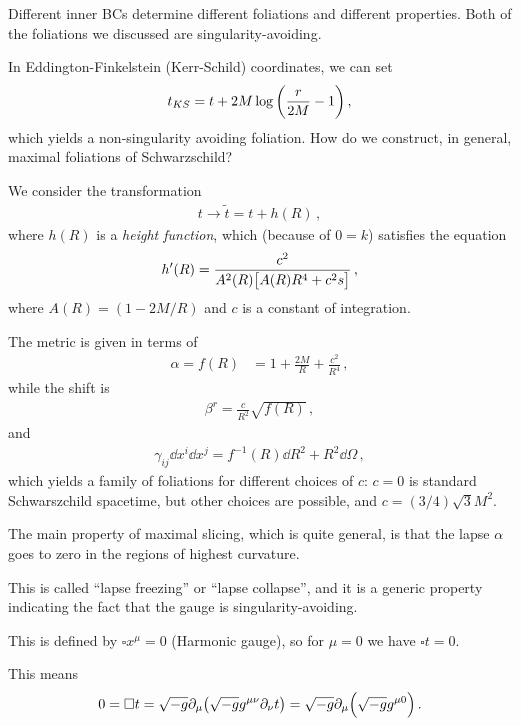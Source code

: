 \documentclass[main.tex]{subfiles}
\begin{document}
Different inner BCs determine different foliations and different properties. 
Both of the foliations we discussed are singularity-avoiding. 

In Eddington-Finkelstein (Kerr-Schild) coordinates, we can set 
%
\begin{align}
t_{KS} = t + 2M \log \qty( \frac{r}{2M} - 1)
\,,
\end{align}
%
which yields a non-singularity avoiding foliation. 
How do we construct, in general, maximal foliations of Schwarzschild?

We consider the transformation 
%
\begin{align}
t \to \widetilde{t} = t + h( R)
\,,
\end{align}
%
where \(h(R)\) is a \emph{height function}, which (because of \(0 = k\)) satisfies the equation 
%
\begin{align}
h'(R) = \frac{c^2}{A^2(R) \qty[ A(R) R^{4} + c^2s]}
\,,
\end{align}
%
where \(A(R) = (1- 2M /R)\) and \(c\) is a constant of integration. 

The metric is given in terms of 
%
\begin{align}
\alpha = f(R) &= 1 + \frac{2M}{R} + \frac{c^2}{R^{4}}
\,,
\end{align}
%
while the shift is 
%
\begin{align}
\beta^{r} = \frac{c}{R^2} \sqrt{f(R)} 
\,,
\end{align}
%
and 
%
\begin{align}
\gamma_{ij} \dd{x^{i}} \dd{x^{j}} = f^{-1} (R) \dd{R^2} + R^2 \dd{\Omega }
\,,
\end{align}
%
which yields a family of foliations for different choices of \(c\): \(c=0\) is standard Schwarszchild spacetime, but other choices are possible, and \(c = (3/4) \sqrt{3} M^2\).

The main property of maximal slicing, which is quite general, is that the lapse \(\alpha \) goes to zero in the regions of highest curvature. 

This is called ``lapse freezing'' or ``lapse collapse'', and it is a generic property indicating the fact that the gauge is singularity-avoiding. 

This is defined by \(\square x^{\mu }=  0\) (Harmonic  gauge), so for \(\mu = 0\) we have \(\square t = 0\). 

This means 
%
\begin{align}
0 = \square t = \sqrt{-g} \partial_{\mu } \qty(\sqrt{-g} g^{\mu \nu } \partial_{\nu } t) = \sqrt{-g} \partial_{\mu } \qty(\sqrt{-g} g^{\mu 0})
\,.
\end{align}
%
\end{document}
